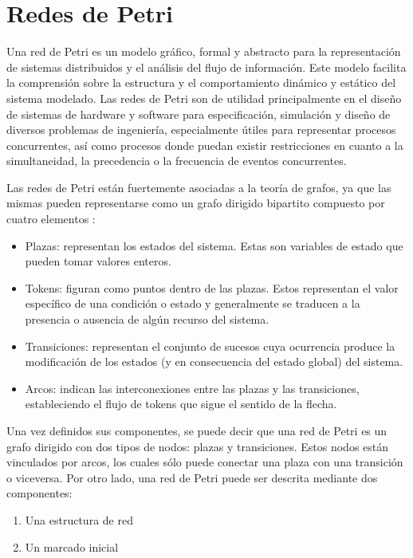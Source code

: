 \section{Redes de Petri}

Una red de Petri es un modelo gráfico, formal y abstracto para la representación de sistemas distribuidos y el análisis del flujo de información. Este modelo facilita la comprensión sobre la estructura y el comportamiento dinámico y estático del sistema modelado. Las redes de Petri son de utilidad principalmente en el diseño de sistemas de hardware y software para especificación, simulación y diseño de diversos problemas de ingeniería, especialmente útiles para representar procesos concurrentes, así como procesos donde puedan existir restricciones en cuanto a la simultaneidad, la precedencia o la frecuencia de eventos concurrentes. \cite{brams}

Las redes de Petri están fuertemente asociadas a la teoría de grafos, ya que las mismas pueden representarse como un grafo dirigido bipartito compuesto por cuatro elementos \cite{libropopn}:

\begin{itemize}
    \item Plazas: representan los estados del sistema. Estas son variables de estado que pueden tomar valores enteros.
    \item Tokens: figuran como puntos dentro de las plazas. Estos representan el valor específico de una condición o estado y generalmente se traducen a la presencia o ausencia de algún recurso del sistema.
    \item Transiciones: representan el conjunto de sucesos cuya ocurrencia produce la modificación de los estados (y en consecuencia del estado global) del sistema.
    \item Arcos: indican las interconexiones entre las plazas y las transiciones, estableciendo el flujo de tokens que sigue el sentido de la flecha.
\end{itemize}

Una vez definidos sus componentes, se puede decir que una red de Petri es un grafo dirigido con dos tipos de nodos: plazas y transiciones. Estos nodos están vinculados por arcos, los cuales sólo puede conectar una plaza con una transición o viceversa. Por otro lado, una red de Petri puede ser descrita mediante dos componentes:

\begin{enumerate}
    \item Una estructura de red
    \item Un marcado inicial
\end{enumerate}

